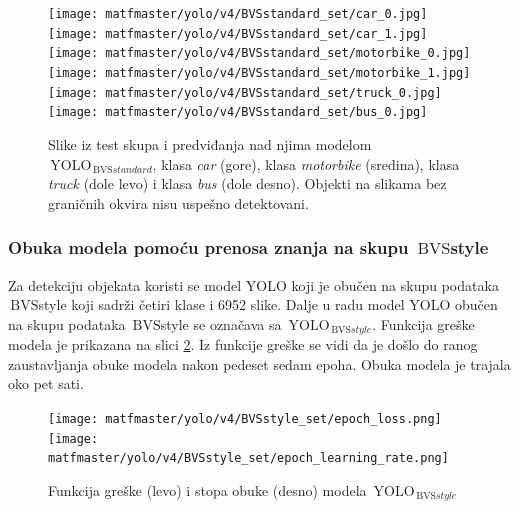 \documentclass[12pt,oneside]{memoir}
\newcommand{\yolo}{\ensuremath{\,\textrm{YOLO}}}
\newcommand{\bvs}{\ensuremath{\,\textrm{BVS}}}
\begin{document}
\begin{figure}[!htbp]
\centering
  \texttt{[image: matfmaster/yolo/v4/BVSstandard\_set/car\_0.jpg]}
  \texttt{[image: matfmaster/yolo/v4/BVSstandard\_set/car\_1.jpg]}
  \texttt{[image: matfmaster/yolo/v4/BVSstandard\_set/motorbike\_0.jpg]}
  \texttt{[image: matfmaster/yolo/v4/BVSstandard\_set/motorbike\_1.jpg]}
  \texttt{[image: matfmaster/yolo/v4/BVSstandard\_set/truck\_0.jpg]}
  \texttt{[image: matfmaster/yolo/v4/BVSstandard\_set/bus\_0.jpg]}
\caption{Slike iz test skupa i predviđanja nad njima modelom  $\yolo_{\bvs{standard}}$, klasa \textit{car} (gore), klasa \textit{motorbike} (sredina), klasa \textit{truck} (dole levo) i klasa \textit{bus} (dole desno). Objekti na slikama bez graničnih okvira nisu uspešno detektovani.}\label{fig:YOLO4_BVSstandard_predictions}
\end{figure}


\subsubsection{Obuka modela pomoću prenosa znanja na skupu \bvs{style}}



Za detekciju objekata koristi se model YOLO koji je obučen na skupu podataka \bvs{style} koji sadrži četiri klase i 6952 slike. Dalje u radu model YOLO obučen na skupu podataka \bvs{style} se označava sa $\yolo_{\bvs{style}}$. Funkcija greške modela je prikazana na slici \ref{fig:YOLO4_BVSstyle_loss}. Iz funkcije greške se vidi da je došlo do ranog zaustavljanja obuke modela nakon pedeset sedam epoha. Obuka modela je trajala oko pet sati.


\begin{figure}[!ht]
\centering
    \texttt{[image: matfmaster/yolo/v4/BVSstyle\_set/epoch\_loss.png]}
    \texttt{[image: matfmaster/yolo/v4/BVSstyle\_set/epoch\_learning\_rate.png]}
\caption{Funkcija greške (levo) i stopa obuke (desno) modela $\yolo_{\bvs{style}}$ }
\label{fig:YOLO4_BVSstyle_loss}
\end{figure}
\end{document}
